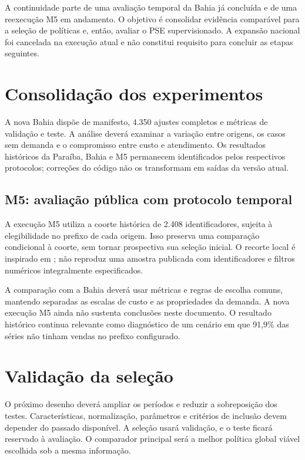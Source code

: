
A continuidade parte de uma avaliação temporal da Bahia já concluída e de uma reexecução M5 em andamento. O objetivo é consolidar evidência comparável para a seleção de políticas e, então, avaliar o PSE supervisionado. A expansão nacional foi cancelada na execução atual e não constitui requisito para concluir as etapas seguintes.

\section{Consolidação dos experimentos}

A nova Bahia dispõe de manifesto, 4.350 ajustes completos e métricas de validação e teste. A análise deverá examinar a variação entre origens, os casos sem demanda e o compromisso entre custo e atendimento. Os resultados históricos da Paraíba, Bahia e M5 permanecem identificados pelos respectivos protocolos; correções do código não os transformam em saídas da versão atual.

\subsection{M5: avaliação pública com protocolo temporal}
\label{sec:estudos_caso_adicionais}

A execução M5 utiliza a coorte histórica de 2.408 identificadores, sujeita à elegibilidade no prefixo de cada origem. Isso preserva uma comparação condicional à coorte, sem tornar prospectiva sua seleção inicial. O recorte local é inspirado em \citet{Zabraoui2025GaDQN}; não reproduz uma amostra publicada com identificadores e filtros numéricos integralmente especificados.

A comparação com a Bahia deverá usar métricas e regras de escolha comuns, mantendo separadas as escalas de custo e as propriedades da demanda. A nova execução M5 ainda não sustenta conclusões neste documento. O resultado histórico continua relevante como diagnóstico de um cenário em que 91,9\% das séries não tinham vendas no prefixo configurado.

\section{Validação da seleção}

O próximo desenho deverá ampliar os períodos e reduzir a sobreposição dos testes. Características, normalização, parâmetros e critérios de inclusão devem depender do passado disponível. A seleção usará validação, e o teste ficará reservado à avaliação. O comparador principal será a melhor política global viável escolhida sob a mesma informação.

